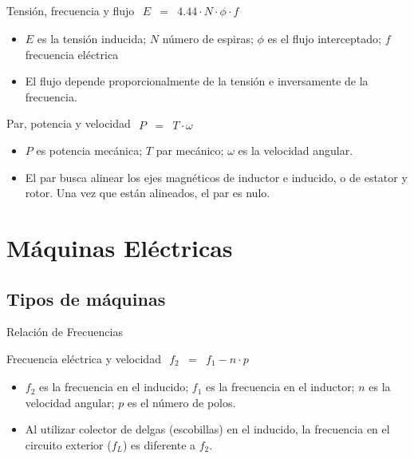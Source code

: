 \documentclass[xcolor={usenames,svgnames,dvipsnames}]{beamer}
\begin{document}
\begin{frame}[label={sec:org17d5555}]{Tensión, frecuencia y flujo}
\(\begin{aligned}
  E & = & 4.44\cdot N\cdot\phi\cdot f\end{aligned}\)

\begin{itemize}
\item \(E\) es la tensión inducida; \(N\) número de espiras; \(\phi\) es el flujo
interceptado; \(f\) frecuencia eléctrica

\item El flujo depende proporcionalmente de la tensión e inversamente de la
frecuencia.
\end{itemize}
\end{frame}

\begin{frame}[label={sec:orga1a6bb8}]{Par, potencia y velocidad}
\(\begin{aligned}
  P & = & T\cdot\omega\end{aligned}\)

\begin{itemize}
\item \(P\) es potencia mecánica; \(T\) par mecánico; \(\omega\) es la velocidad
angular.

\item El par busca alinear los ejes magnéticos de inductor e inducido, o de
estator y rotor. Una vez que están alineados, el par es nulo.
\end{itemize}
\end{frame}

\section{Máquinas Eléctricas}
\label{sec:org4627922}


\subsection{Tipos de máquinas}
\label{sec:orgbe18661}


\begin{frame}[label={sec:orgf72d255}]{Relación de Frecuencias}
\begin{block}{Frecuencia eléctrica y velocidad}
\(\begin{aligned}
  f_{2} & = & f_{1}-n\cdot p\end{aligned}\)

\begin{itemize}
\item \(f_{2}\) es la frecuencia en el inducido; \(f_{1}\) es la frecuencia en
el inductor; \(n\) es la velocidad angular; \(p\) es el número de polos.

\item Al utilizar colector de delgas (escobillas) en el inducido, la
frecuencia en el circuito exterior (\(f_{L}\)) es diferente a \(f_{2}\).
\end{itemize}
\end{block}
\end{frame}
\end{document}
